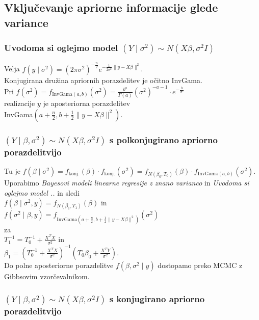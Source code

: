 \documentclass[a4paper, 12pt]{book}
\theoremstyle{definition}
\theoremstyle{remark}
\begin{document}
\subsection{Vključevanje apriorne informacije glede variance}

\subsubsection{Uvodoma si oglejmo model $(Y \mid \sigma^2) \sim N(X \beta, \sigma^2 I)$}

Velja $f(y \mid \sigma^2) = (2 \pi \sigma^2)^{-\frac{n}{2}} e^{-\frac{1}{2 \sigma^2} \lVert y - X \beta\rVert^2}$. \\
Konjugirana družina apriornih porazdelitev je očitno InvGama. \\
Pri $f(\sigma^2) = f_{\text{InvGama}(a,b)}(\sigma^2) = \frac{b^a}{\Gamma(a)} (\sigma^2)^{-a-1}
\cdot e^{-\frac{b}{\sigma^2}}$ \\
realizacije $y$ je aposteriorna porazdelitev \\
InvGama$(a + \frac{n}{2}, b + \frac{1}{2} \lVert y - X \beta \rVert^2)$.

\subsubsection{$(Y \mid \beta, \sigma^2) \sim N(X \beta, \sigma^2 I)$ s polkonjugirano apriorno porazdelitvijo}

Tu je $f(\beta \mid \sigma^2) = f_{\text{konj.}}(\beta) \cdot f_{\text{konj.}}(\sigma^2) =
f_{N(\beta_0, T_0)}(\beta) \cdot f_{\text{InvGama}(a,b)}(\sigma^2)$. \\
Uporabimo \textit{Bayesovi modeli linearne regresije z znano varianco} in
\textit{Uvodoma si oglejmo model ..} in sledi \\
$f(\beta \mid \sigma^2, y) = f_{N(\beta_1, T_1)}(\beta)$ in \\
$f(\sigma^2 \mid \beta, y) = f_{\text{InvGama}(a + \frac{n}{2},
b + \frac{1}{2} \lVert y - X \beta \rVert^2)}(\sigma^2)$ \\
za \\
$T_1^{-1} = T_0^{-1} + \frac{X^T X}{\sigma^2}$ in \\
$\beta_1 = (T_0^{-1} + \frac{X^T X}{\sigma^2})^{-1} (T_0 \beta_0 + \frac{X^T Y}{\sigma^2})$. \\
Do polne aposteriorne porazdelitve $f(\beta, \sigma^2 \mid y)$ dostopamo preko MCMC z Gibbsovim vzorčevalnikom.

\subsubsection{$(Y \mid \beta, \sigma^2) \sim N(X \beta, \sigma^2 I)$ s konjugirano apriorno porazdelitvijo}
\end{document}
